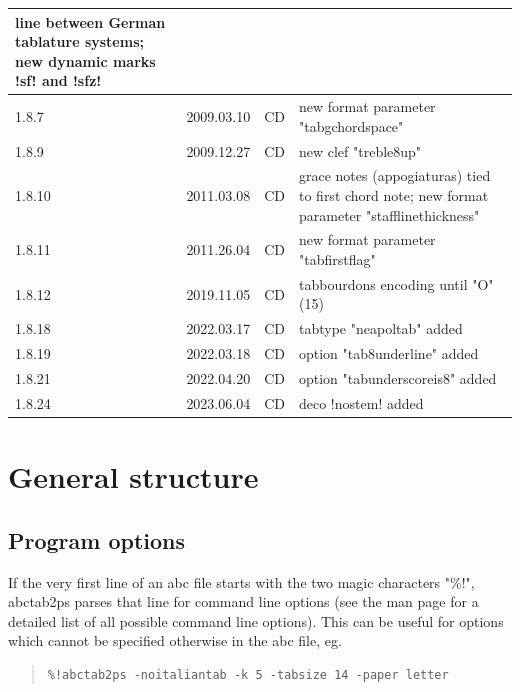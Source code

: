 \documentclass[a4paper]{article}
\begin{document}
\begin{center}
\begin{longtable}{|l|l|l|p{8cm}|}
    line between German tablature systems; new dynamic marks !sf! and !sfz!
    \\ \hline
1.8.7 & 2009.03.10 & CD & new format parameter "tabgchordspace" \\ \hline
1.8.9 & 2009.12.27 & CD & new clef "treble8up" \\ \hline
1.8.10 & 2011.03.08 & CD & grace notes (appogiaturas) tied to first chord note;
    new format parameter "stafflinethickness" \\ \hline
1.8.11 & 2011.26.04 & CD & new format parameter "tabfirstflag"
    \\ \hline
1.8.12 & 2019.11.05 & CD & tabbourdons encoding until "O" (15)
    \\ \hline
1.8.18 & 2022.03.17 & CD & tabtype "neapoltab" added
    \\ \hline
1.8.19 & 2022.03.18 & CD & option "tab8underline" added
    \\ \hline
1.8.21 & 2022.04.20 & CD & option "tabunderscoreis8" added
    \\ \hline
1.8.24 & 2023.06.04 & CD & deco !nostem! added
    \\ \hline
\end{longtable}
\end{center}

\section{General structure}

\subsection{Program options}
If the very first line of an abc file starts with the two magic 
characters "\%!", abctab2ps parses that line for command
line options (see the man page for a detailed list of all possible 
command line options). This can be useful for options which cannot
be specified otherwise in the abc file, eg.

\begin{quote}
\begin{verbatim}
%!abctab2ps -noitaliantab -k 5 -tabsize 14 -paper letter
\end{verbatim}
\end{quote}
\end{document}
